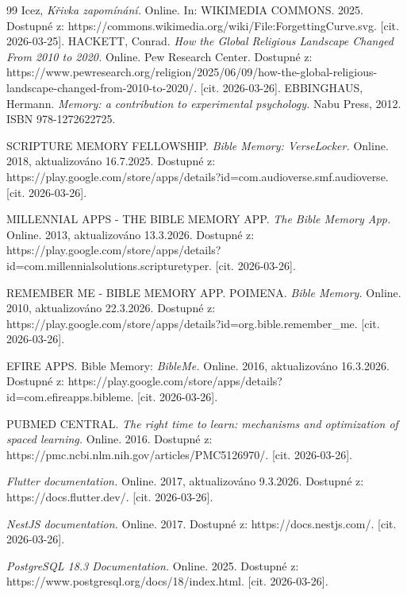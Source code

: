 \documentclass[12pt, a4paper, oneside]{article}
\begin{document}
	\begin{thebibliography}{99}
		Icez, \textit{Křivka zapomínání.} Online. In: WIKIMEDIA COMMONS. 2025. Dostupné z: https://commons.wikimedia.org/wiki/File:ForgettingCurve.svg. [cit. 2026-03-25].
		HACKETT, Conrad. \textit{How the Global Religious Landscape Changed From 2010 to 2020.} Online. Pew Research Center. Dostupné z: https://www.pewresearch.org/religion/2025/06/09/how-the-global-religious-landscape-changed-from-2010-to-2020/. [cit. 2026-03-26].
		EBBINGHAUS, Hermann. \textit{Memory: a contribution to experimental psychology.} Nabu Press, 2012. ISBN 978-1272622725.
		
		SCRIPTURE MEMORY FELLOWSHIP. \textit{Bible Memory: VerseLocker.} Online. 2018, aktualizováno 16.7.2025. Dostupné z: https://play.google.com/store/apps/details?id=com.audioverse.smf.audioverse. [cit. 2026-03-26].
		
		MILLENNIAL APPS - THE BIBLE MEMORY APP. \textit{The Bible Memory App.} Online. 2013, aktualizováno 13.3.2026. Dostupné z: https://play.google.com/store/apps/details?id=com.millennialsolutions.scripturetyper. [cit. 2026-03-26].
		
		REMEMBER ME - BIBLE MEMORY APP. POIMENA. \textit{Bible Memory.} Online. 2010, aktualizováno 22.3.2026. Dostupné z: https://play.google.com/store/apps/details?id=org.bible.remember\_me. [cit. 2026-03-26].
		
		EFIRE APPS. Bible Memory: \textit{BibleMe.} Online. 2016, aktualizováno 16.3.2026. Dostupné z: https://play.google.com/store/apps/details?id=com.efireapps.bibleme. [cit. 2026-03-26].
		
		PUBMED CENTRAL. \textit{The right time to learn: mechanisms and optimization of spaced learning.} Online. 2016. Dostupné z: https://pmc.ncbi.nlm.nih.gov/articles/PMC5126970/. [cit. 2026-03-26].
		
		\textit{Flutter documentation.} Online. 2017, aktualizováno 9.3.2026. Dostupné z: https://docs.flutter.dev/. [cit. 2026-03-26].
		
		\textit{NestJS documentation.} Online. 2017. Dostupné z: https://docs.nestjs.com/. [cit. 2026-03-26].
		
		\textit{PostgreSQL 18.3 Documentation.} Online. 2025. Dostupné z: https://www.postgresql.org/docs/18/index.html. [cit. 2026-03-26].
		

\end{thebibliography}
\end{document}
